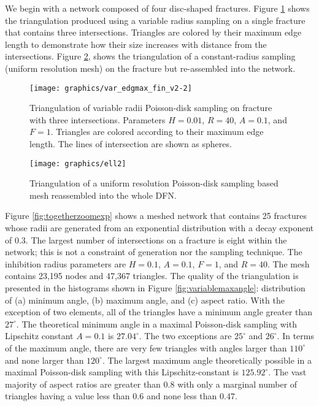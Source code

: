 \documentclass[preprint, 10pt]{elsarticle}
\theoremstyle{definition}
\theoremstyle{remark}
\begin{document}
We begin with a network composed of four disc-shaped fractures. 
Figure \ref{fig:varedgmaxfin} shows the triangulation produced using a variable radius sampling on a single fracture that contains three intersections. 
Triangles are colored by their maximum edge length to demonstrate how their size increases with distance from the intersections.  
Figure \ref{fig:2d-together}, shows the triangulation of a constant-radius sampling (uniform resolution mesh) on the fracture but re-assembled into the network.

\begin{figure}
	\centering
            \texttt{[image: graphics/var\_edgmax\_fin\_v2-2]}
	\caption{Triangulation of variable radii Poisson-disk sampling on fracture with three intersections. Parameters $H=0.01$, $R=40$, $A=0.1$, and $F=1$. Triangles are colored according to their maximum edge length. The lines of intersection are shown as spheres. }
	\label{fig:varedgmaxfin}
\end{figure}

 
\begin{figure}
	\centering
	\texttt{[image: graphics/ell2]}
	\caption{Triangulation of a uniform resolution Poisson-disk sampling based mesh reassembled into the whole DFN.}
	\label{fig:2d-together}
\end{figure}



Figure \ref{fig:togetherzoomexp} shows a meshed network that contains 25 fractures whose radii are generated from an exponential distribution with a decay exponent of 0.3.
The largest number of intersections on a fracture is eight within the network; this is not a constraint of generation nor the sampling technique.
The inhibition radius parameters are $H=0.1$, $A=0.1$, $F=1$, and $R=40$.
The mesh contains 23,195 nodes and 47,367 triangles.
The quality of the triangulation is presented in the histograms shown in Figure \ref{fig:variablemaxangle}: distribution of (a) minimum angle, (b) maximum angle, and (c) aspect ratio. 
With the exception of two elements, all of the triangles have a minimum angle greater than $27^\circ$.
The theoretical minimum angle in a maximal Poisson-disk sampling with Lipschitz constant $A=0.1$ is $27.04^\circ$. 
The two exceptions are $25^\circ$ and $26^\circ$.
In terms of the maximum angle, there are very few triangles with angles larger than $110^\circ$ and none larger than $120^\circ$. 
The largest maximum angle theoretically possible in a maximal Poisson-disk sampling with this Lipschitz-constant is $125.92^\circ$. 
The vast majority of aspect ratios are greater than $0.8$ with only a marginal number of triangles having a value less than $0.6$ and none less than $0.47$.
\end{document}
